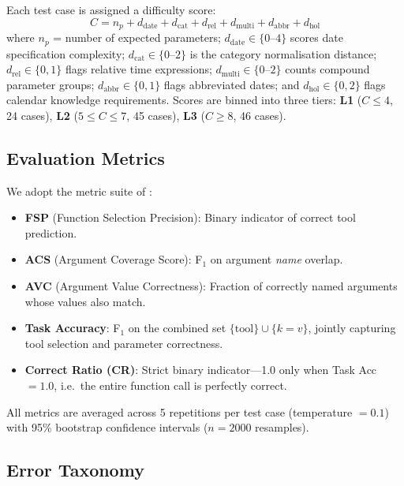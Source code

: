 \documentclass[11pt,twocolumn]{article}
\begin{document}
Each test case is assigned a difficulty score:
\begin{equation}
C = n_p + d_{\text{date}} + d_{\text{cat}} + d_{\text{rel}} + d_{\text{multi}} + d_{\text{abbr}} + d_{\text{hol}}
\label{eq:complexity}
\end{equation}
where $n_p$ = number of expected parameters; $d_{\text{date}} \in \{0\text{--}4\}$ scores date specification complexity; $d_{\text{cat}} \in \{0\text{--}2\}$ is the category normalisation distance; $d_{\text{rel}} \in \{0,1\}$ flags relative time expressions; $d_{\text{multi}} \in \{0\text{--}2\}$ counts compound parameter groups; $d_{\text{abbr}} \in \{0,1\}$ flags abbreviated dates; and $d_{\text{hol}} \in \{0,2\}$ flags calendar knowledge requirements.
Scores are binned into three tiers: \textbf{L1} ($C\leq4$, 24 cases), \textbf{L2} ($5\leq C\leq7$, 45 cases), \textbf{L3} ($C\geq8$, 46 cases).

\subsection{Evaluation Metrics}

We adopt the metric suite of \citet{kavathekar2025small}:

\begin{itemize}
    \item \textbf{FSP} (Function Selection Precision): Binary indicator of correct tool prediction.
    \item \textbf{ACS} (Argument Coverage Score): F$_1$ on argument \emph{name} overlap.
    \item \textbf{AVC} (Argument Value Correctness): Fraction of correctly named arguments whose values also match.
    \item \textbf{Task Accuracy}: F$_1$ on the combined set $\{\text{tool}\} \cup \{k{=}v\}$, jointly capturing tool selection and parameter correctness.
    \item \textbf{Correct Ratio (CR)}: Strict binary indicator---1.0 only when Task Acc $= 1.0$, i.e.\ the entire function call is perfectly correct.
\end{itemize}

All metrics are averaged across 5 repetitions per test case (temperature $= 0.1$) with 95\% bootstrap confidence intervals \citep{efron1979bootstrap} ($n=2000$ resamples).

\subsection{Error Taxonomy}
\end{document}
